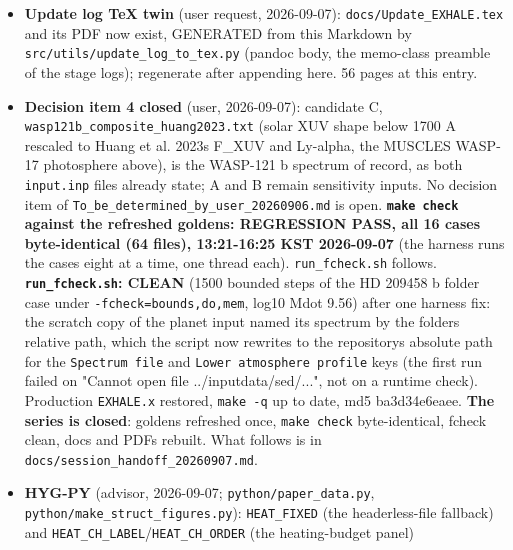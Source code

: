 \documentclass[english,a4paper]{my_memo}
\begin{document}
\begin{itemize}
  are now \texttt{\textbackslash{}path\{\}} (url package, breaks at \texttt{/} and \texttt{\_}), one inside a
  caption kept as \texttt{\textbackslash{}texttt} (a moving argument). Rebuilt with latexmk, so
  the longtable column widths and cross-references are resolved (a single
  \texttt{pdflatex} pass leaves both unresolved, which is what produced the
  "Table ??" and the first overflow the user saw).
\item
  \textbf{Update log TeX twin} (user request, 2026-09-07): \texttt{docs/Update\_EXHALE.tex}
  and its PDF now exist, GENERATED from this Markdown by
  \texttt{src/utils/update\_log\_to\_tex.py} (pandoc body, the memo-class preamble of
  the stage logs); regenerate after appending here. 56 pages at this entry.
\item
  \textbf{Decision item 4 closed} (user, 2026-09-07): candidate C,
  \texttt{wasp121b\_composite\_huang2023.txt} (solar XUV shape below 1700 A rescaled to
  Huang et al. 2023\textquotesingle s F\_XUV and Ly-alpha, the MUSCLES WASP-17 photosphere
  above), is the WASP-121 b spectrum of record, as both \texttt{input.inp} files
  already state; A and B remain sensitivity inputs. No decision item of
  \texttt{To\_be\_determined\_by\_user\_20260906.md} is open.
  \textbf{\texttt{make\ check} against the refreshed goldens: REGRESSION PASS, all 16 cases
  byte-identical (64 files), 13:21-16:25 KST 2026-09-07} (the harness runs
  the cases eight at a time, one thread each). \texttt{run\_fcheck.sh} follows.
  \textbf{\texttt{run\_fcheck.sh}: CLEAN} (1500 bounded steps of the HD 209458 b folder
  case under \texttt{-fcheck=bounds,do,mem}, log10 Mdot 9.56) after one harness fix:
  the scratch copy of the planet input named its spectrum by the folder\textquotesingle s
  relative path, which the script now rewrites to the repository\textquotesingle s absolute
  path for the \texttt{Spectrum\ file} and \texttt{Lower\ atmosphere\ profile} keys (the first
  run failed on "Cannot open file ../inputdata/sed/...", not on a runtime
  check). Production \texttt{EXHALE.x} restored, \texttt{make\ -q} up to date, md5
  ba3d34e6eaee. \textbf{The series is closed}: goldens refreshed once, \texttt{make\ check} byte-identical, fcheck clean, docs and PDFs rebuilt. What follows is
  in \texttt{docs/session\_handoff\_20260907.md}.
\item
  \textbf{HYG-PY} (advisor, 2026-09-07; \texttt{python/paper\_data.py},
  \texttt{python/make\_struct\_figures.py}): \texttt{HEAT\_FIXED} (the headerless-file
  fallback) and \texttt{HEAT\_CH\_LABEL}/\texttt{HEAT\_CH\_ORDER} (the heating-budget panel)

\end{itemize}
\end{document}

